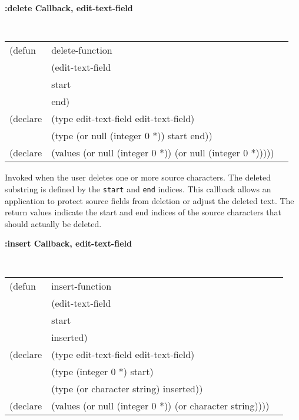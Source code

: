 {\samepage
{\large {\bf :delete \hfill Callback, edit-text-field}} 
\begin{flushright} 
\parbox[t]{6.125in}{
\tt
\begin{tabular}{lll}
\raggedright
(defun & delete-function & \\
       & (edit-text-field\\
       & start\\
       & end)\\
(declare & (type  edit-text-field  edit-text-field)\\
         & (type (or null (integer 0 *))  start end))\\
(declare & (values (or null (integer 0 *)) (or null (integer 0 *)))))
\end{tabular}
\rm

}\end{flushright}}

\begin{flushright} \parbox[t]{6.125in}{ Invoked when the user deletes one or more
source characters.  The deleted substring is defined
by the {\tt start} and {\tt end} indices.  This callback allows an application
to protect source fields from deletion or adjust the deleted text.  The return
values indicate the start and end indices of the source characters that should
actually be deleted.

}\end{flushright}


{\samepage
{\large {\bf :insert \hfill Callback, edit-text-field}} 
\begin{flushright} 
\parbox[t]{6.125in}{
\tt
\begin{tabular}{lll}
\raggedright
(defun & insert-function & \\
       & (edit-text-field\\
       & start\\
       & inserted)\\
(declare & (type  edit-text-field  edit-text-field)\\
         & (type (integer 0 *)  start)\\
         & (type (or character string)  inserted))\\
(declare & (values (or null (integer 0 *)) (or character string))))
\end{tabular}
\rm

}\end{flushright}}

